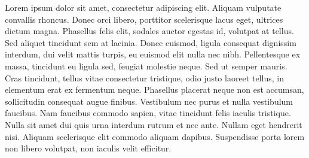 Lorem ipsum dolor sit amet, consectetur adipiscing elit. Aliquam vulputate convallis rhoncus. Donec orci libero, porttitor scelerisque lacus eget, ultrices dictum magna. Phasellus felis elit, sodales auctor egestas id, volutpat at tellus. Sed aliquet tincidunt sem at lacinia. Donec euismod, ligula consequat dignissim interdum, dui velit mattis turpis, eu euismod elit nulla nec nibh. Pellentesque ex massa, tincidunt eu ligula sed, feugiat molestie neque. Sed ut semper mauris. Cras tincidunt, tellus vitae consectetur tristique, odio justo laoreet tellus, in elementum erat ex fermentum neque. Phasellus placerat neque non est accumsan, sollicitudin consequat augue finibus. Vestibulum nec purus et nulla vestibulum faucibus. Nam faucibus commodo sapien, vitae tincidunt felis iaculis tristique. Nulla sit amet dui quis urna interdum rutrum et nec ante. Nullam eget hendrerit nisi. Aliquam scelerisque elit commodo aliquam dapibus. Suspendisse porta lorem non libero volutpat, non iaculis velit efficitur.~\cite{DBLP:journals/cacm/Dijkstra68a}